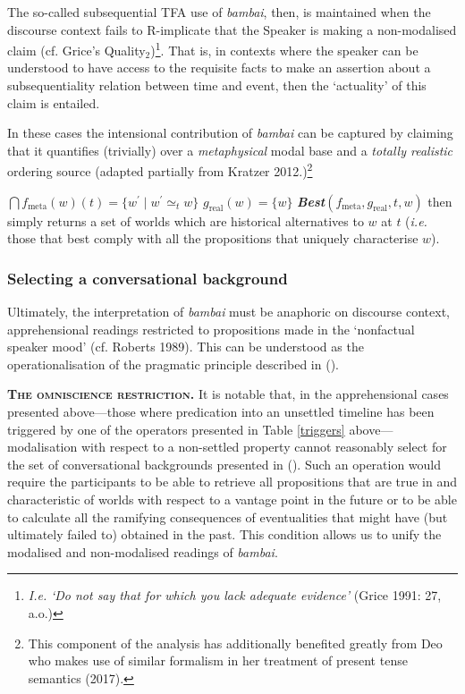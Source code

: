 \documentclass[12pt]{article}
\begin{document}
\normalsize
The so-called subsequential TFA use of \textit{bambai}, then, is maintained when the discourse context fails to R-implicate that the Speaker is making a non-modalised claim (cf. Grice's Quality$_2$)\footnote{\textit{I.e.} \textit{`Do not say that for which you lack adequate evidence'} (Grice 1991: 27, a.o.)}. That is, in contexts where the speaker can be understood to have access to the requisite facts to make an assertion about a subsequentiality relation between time and event, then the `actuality' of this claim is entailed.

In these cases the intensional contribution of \textit{bambai} can be captured by claiming that it quantifies (trivially) over a \textit{metaphysical} modal base and a \textit{totally realistic} ordering source (adapted partially from Kratzer 2012.)\footnote{This component of the analysis has additionally benefited greatly from Deo who makes use of similar formalism in her treatment of present tense semantics (2017).}

\pex
\a{}$\bigcap f_{\text{meta}}(w)(t)=\{w^\prime\mid w^\prime\simeq_t w\}$
\a $ g_{\text{real}}(w)=\{w\}$
\a \textbf{\textit{Best}}$(f_{\text{meta}},g_{\text{real}},t,w)$ then simply returns a set of worlds which are historical alternatives to $w$ at $t$ (\textit{i.e.} those that best comply with all the propositions that uniquely characterise $w$).
\xe


\subsubsection{Selecting a conversational background}
Ultimately, the interpretation of \textit{bambai} must be anaphoric on discourse context, apprehensional readings restricted to propositions made in the `nonfactual speaker mood' (cf. Roberts 1989). This can be understood as the operationalisation of the pragmatic principle described in (\nextx).

\pex\textsc{\textbf{The omniscience restriction.}} It is notable that, in the apprehensional cases presented above---those where predication into an unsettled timeline has been triggered by one of the operators presented in Table \ref{triggers} above--- modalisation with respect to a non-settled property cannot reasonably select for the set of conversational backgrounds presented in (\lastx). Such an operation would require the participants to be able to retrieve all propositions that are true in and characteristic of worlds with respect to a vantage point in the future or to be able to calculate all the ramifying consequences of eventualities that might have (but ultimately failed to) obtained in the past. This condition allows us to unify the modalised and non-modalised readings of \textit{bambai}.
\xe
\end{document}
